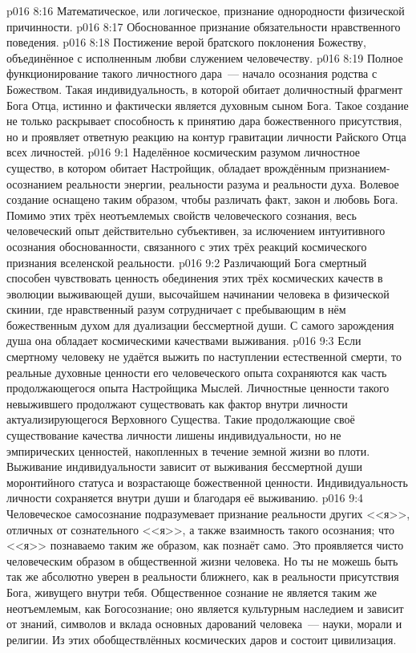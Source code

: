 \vs p016 8:16 Математическое, или логическое, признание однородности физической причинности.
\vs p016 8:17 Обоснованное признание обязательности нравственного поведения.
\vs p016 8:18 Постижение верой братского поклонения Божеству, объединённое с исполненным любви служением человечеству.
\vs p016 8:19 \pc Полное функционирование такого личностного дара~--- начало осознания родства с Божеством. Такая индивидуальность, в которой обитает доличностный фрагмент Бога Отца, истинно и фактически является духовным сыном Бога. Такое создание не только раскрывает способность к принятию дара божественного присутствия, но и проявляет ответную реакцию на контур гравитации личности Райского Отца всех личностей.
\vs p016 9:1 Наделённое космическим разумом личностное существо, в котором обитает Настройщик, обладает врождённым признанием\hyp{}осознанием реальности энергии, реальности разума и реальности духа. Волевое создание оснащено таким образом, чтобы различать факт, закон и любовь Бога. Помимо этих трёх неотъемлемых свойств человеческого сознания, весь человеческий опыт действительно субъективен, за ислючением интуитивного осознания обоснованности, связанного с  этих трёх реакций космического признания вселенской реальности.
\vs p016 9:2 Различающий Бога смертный способен чувствовать ценность обединения этих трёх космических качеств в эволюции выживающей души, высочайшем начинании человека в физической скинии, где нравственный разум сотрудничает с пребывающим в нём божественным духом для дуализации бессмертной души. С самого зарождения душа  она обладает космическими качествами выживания.
\vs p016 9:3 Если смертному человеку не удаётся выжить по наступлении естественной смерти, то реальные духовные ценности его человеческого опыта сохраняются как часть продолжающегося опыта Настройщика Мыслей. Личностные ценности такого невыжившего продолжают существовать как фактор внутри личности актуализирующегося Верховного Существа. Такие продолжающие своё существование качества личности лишены индивидуальности, но не эмпирических ценностей, накопленных в течение земной жизни во плоти. Выживание индивидуальности зависит от выживания бессмертной души моронтийного статуса и возрастающе божественной ценности. Индивидуальность личности сохраняется внутри души и благодаря её выживанию.
\vs p016 9:4 \pc Человеческое самосознание подразумевает признание реальности других <<я>>, отличных от сознательного <<я>>, а также взаимность такого осознания; что <<я>> познаваемо таким же образом, как познаёт само. Это проявляется чисто человеческим образом в общественной жизни человека. Но ты не можешь быть так же абсолютно уверен в реальности ближнего, как в реальности присутствия Бога, живущего внутри тебя. Общественное сознание не является таким же неотъемлемым, как Богосознание; оно является культурным наследием и зависит от знаний, символов и вклада основных дарований человека~--- науки, морали и религии. Из этих обобществлённых космических даров и состоит цивилизация.
